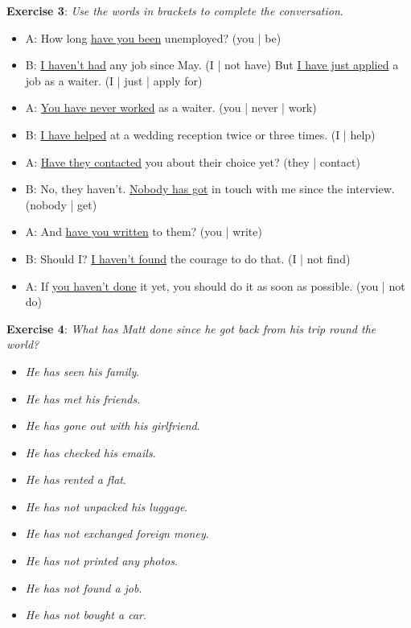 \textbf{Exercise 3}: \textit{Use the words in brackets  to complete the conversation}.

\begin{itemize}

\item A: How long \underline{have you been} unemployed? (you | be)
\item B: \underline{I haven't had} any job since May. (I | not have) But \underline{I have just applied} a job as a waiter. (I | just | apply for)
\item A: \underline{You have never worked} as a waiter. (you | never | work)
\item B: \underline{I have helped} at a wedding reception twice or three times. (I | help)
\item A: \underline{Have they contacted} you about their choice yet? (they | contact)
\item B: No, they haven't. \underline{Nobody has got}  in touch with me since the interview. (nobody | get)
\item A: And \underline{have you written} to them? (you | write)
\item B: Should I? \underline{I haven't found} the courage to do that. (I | not find)
\item A: If \underline{you haven't done} it yet, you should do it as soon as possible. (you | not do)
\end{itemize}

\textbf{Exercise 4}: \textit{What has Matt done since he got back from his trip round the world?}

\begin{itemize}

\item \textit{He has seen his family}.
\item \textit{He has met his friends}.
\item \textit{He has gone out with his girlfriend}.
\item \textit{He has checked his emails}.
\item \textit{He has rented a flat}.

\item \textit{He has not unpacked his luggage}.
\item \textit{He has not exchanged foreign money}.
\item \textit{He has not printed any photos}.
\item \textit{He has not found a job}.
\item \textit{He has not bought a car}.

\end{itemize}

